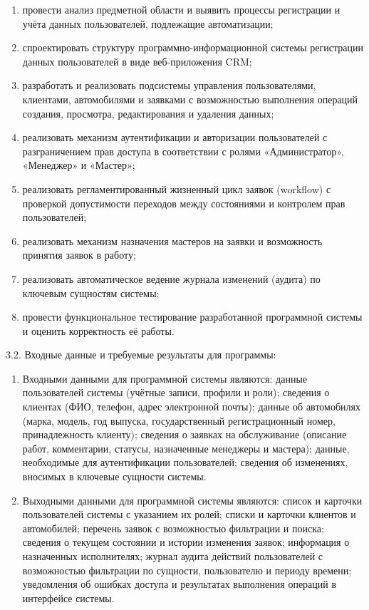 \begin{enumerate}
\item провести анализ предметной области и выявить процессы регистрации и учёта данных пользователей, подлежащие автоматизации;
\item спроектировать структуру программно-информационной системы регистрации данных пользователей в виде веб-приложения CRM;
\item разработать и реализовать подсистемы управления пользователями, клиентами, автомобилями и заявками с возможностью выполнения операций создания, просмотра, редактирования и удаления данных;
\item реализовать механизм аутентификации и авторизации пользователей с разграничением прав доступа в соответствии с ролями «Администратор», «Менеджер» и «Мастер»;
\item реализовать регламентированный жизненный цикл заявок (workflow) с проверкой допустимости переходов между состояниями и контролем прав пользователей;
\item реализовать механизм назначения мастеров на заявки и возможность принятия заявок в работу;
\item реализовать автоматическое ведение журнала изменений (аудита) по ключевым сущностям системы;
\item провести функциональное тестирование разработанной программной системы и оценить корректность её работы.
\end{enumerate}

{\parindent0pt
  3.2. Входные данные и требуемые результаты для программы:}

\begin{enumerate}
\item Входными данными для программной системы являются: данные пользователей системы (учётные записи, профили и роли); сведения о клиентах (ФИО, телефон, адрес электронной почты); данные об автомобилях (марка, модель, год выпуска, государственный регистрационный номер, принадлежность клиенту); сведения о заявках на обслуживание (описание работ, комментарии, статусы, назначенные менеджеры и мастера); данные, необходимые для аутентификации пользователей; сведения об изменениях, вносимых в ключевые сущности системы.
\item Выходными данными для программной системы являются: список и карточки пользователей системы с указанием их ролей; списки и карточки клиентов и автомобилей; перечень заявок с возможностью фильтрации и поиска; сведения о текущем состоянии и истории изменения заявок; информация о назначенных исполнителях; журнал аудита действий пользователей с возможностью фильтрации по сущности, пользователю и периоду времени; уведомления об ошибках доступа и результатах выполнения операций в интерфейсе системы.
\end{enumerate}

